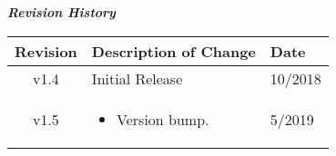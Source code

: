 \begin{center}
	\textit{\textbf{Revision History}}
		\begin{table}[H]
		\label{table:revisions} %
			\begin{tabularx}{\textwidth}{|c|X|l|}
			\hline
			\rowcolor{blue}
			\textbf{Revision} & \textbf{Description of Change} & \textbf{Date} \\
		    \hline
		    v1.4 & Initial Release & 10/2018 \\
		    \hline
        v1.5 & \begin{itemize} \item Version bump.  \end{itemize} & 5/2019 \\
		    \hline
			\end{tabularx}
		\end{table}
	\end{center}

